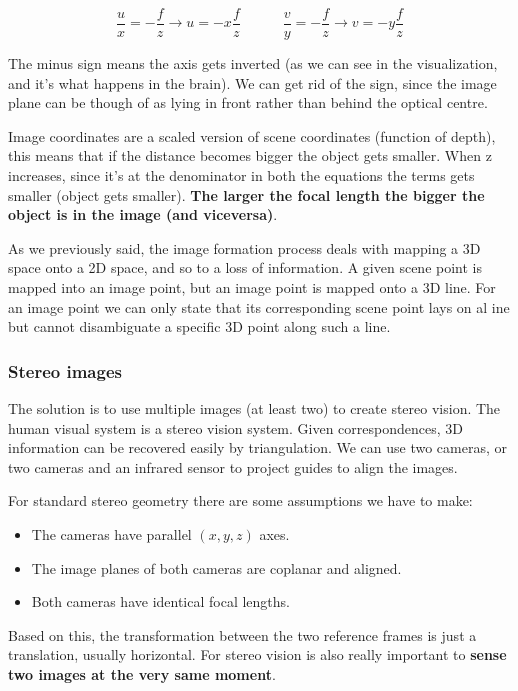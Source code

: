 \documentclass{article}
\begin{document}
$$\frac{u}{x} = -\frac{f}{z} \rightarrow u = -x\frac{f}{z} \quad\quad\quad \frac{v}{y} = - \frac{f}{z} \rightarrow v = -y\frac{f}{z}$$

The minus sign means the axis gets inverted (as we can see in the visualization, and it's what happens in the brain).
We can get rid of the sign, since the image plane can be though of as lying in front rather than behind the optical centre.

Image coordinates are a scaled version of scene coordinates (function of depth), this means that if the distance becomes bigger the object gets smaller.
When z increases, since it's at the denominator in both the equations the terms gets smaller (object gets smaller).
\textbf{The larger the focal length the bigger the object is in the image (and viceversa)}.

As we previously said, the image formation process deals with mapping a 3D space onto a 2D space, and so to a loss of information.
A given scene point is mapped into an image point, but an image point is mapped onto a 3D line.
For an image point we can only state that its corresponding scene point lays on al ine but cannot disambiguate a specific 3D point along such a line.

\subsubsection{Stereo images}

The solution is to use multiple images (at least two) to create stereo vision.
The human visual system is a stereo vision system.
Given correspondences, 3D information can be recovered easily by triangulation.
We can use two cameras, or two cameras and an infrared sensor to project guides to align the images.

For standard stereo geometry there are some assumptions we have to make:
\begin{itemize}
  \item The cameras have parallel $(x,y,z)$ axes.
  \item The image planes of both cameras are coplanar and aligned.
  \item Both cameras have identical focal lengths.
\end{itemize}

Based on this, the transformation between the two reference frames is just a translation, usually horizontal.
For stereo vision is also really important to \textbf{sense two images at the very same moment}.
\end{document}
